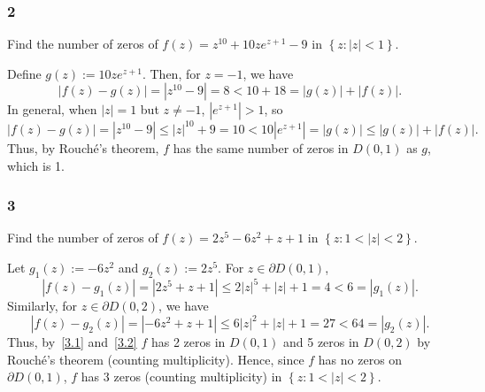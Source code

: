 \documentclass[12pt]{article}
\begin{document}
\newpage
\subsubsection*{2}
\begin{tcolorbox}
  Find the number of zeros of $f(z) = z^{10} + 10ze^{z + 1} - 9$ in $\left\{ z : |z| < 1 \right\}$.
\end{tcolorbox}
Define $g(z) := 10ze^{z+1}$. Then, for $z = -1$, we have
\[ |f(z) - g(z)| = |z^{10} - 9| = 8 < 10 + 18 = |g(z)| + |f(z)|. \]
In general, when $|z| = 1$ but $z \neq -1$, $|e^{z + 1}| > 1$, so
\[ |f(z) - g(z)| = |z^{10} - 9| \leq |z|^{10} + 9 = 10 < 10|e^{z+1}| = |g(z)| \leq |g(z)| + |f(z)|. \]
Thus, by Rouch\'{e}'s theorem, $f$ has the same number of zeros in $D(0,1)$ as $g$, which is 1.

\subsubsection*{3}
\begin{tcolorbox}
  Find the number of zeros of $f(z) = 2z^5 - 6z^2 + z + 1$ in $\left\{ z : 1 < |z| < 2 \right\}$.
\end{tcolorbox}
Let $g_1(z) := -6z^2$ and $g_2(z) := 2z^5$. For $z \in \partial D(0,1)$,
\begin{equation}
  |f(z) - g_1(z)| = |2z^5 + z + 1| \leq 2|z|^5 + |z| + 1 = 4 < 6 = |g_1(z)|.
  \label{3.1}
\end{equation}
Similarly, for $z \in \partial D(0,2)$, we have
\begin{equation}
  |f(z) - g_2(z)| = |-6z^2 + z + 1| \leq 6|z|^2 + |z| + 1 = 27 < 64 = |g_2(z)|.
  \label{3.2}
\end{equation}
Thus, by~\eqref{3.1} and~\eqref{3.2} $f$ has 2 zeros in $D(0,1)$ and 5 zeros in $D(0,2)$ by Rouch\'{e}'s theorem (counting multiplicity). Hence, since
$f$ has no zeros on $\partial D(0,1)$, $f$ has 3 zeros (counting multiplicity) in $\left\{ z : 1 < |z| < 2 \right\}$.
\end{document}
